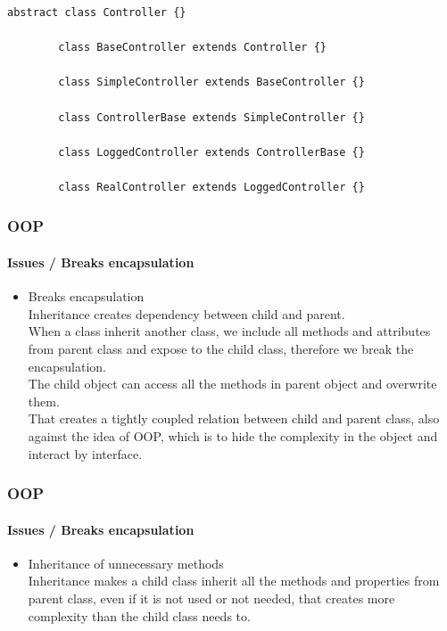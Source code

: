 \begin{frame}[fragile,c]
\begin{minipage}{.80\textwidth}
\begin{lstlisting}[numbers=none]
        abstract class Controller {}

        class BaseController extends Controller {}

        class SimpleController extends BaseController {}

        class ControllerBase extends SimpleController {}

        class LoggedController extends ControllerBase {}

        class RealController extends LoggedController {}
        \end{lstlisting}
    \end{minipage}
\end{frame}

\begin{frame}
    \frametitle{OOP}
    \framesubtitle{Issues / Breaks encapsulation}

    \begin{itemize}
        \item Breaks encapsulation\pause
              \textcolor{ecgrey!50}{
              \\Inheritance creates dependency between child and parent.\pause
              \\When a class inherit another class, we include all methods and attributes from parent
              class and expose to the child class, therefore we break the encapsulation.\pause
              \\The child object can access all the methods in parent object and overwrite them.\pause
              \\That creates a tightly coupled relation between child and parent class,
              also against the idea of OOP, which is to hide the complexity in the
              object and interact by interface.}
    \end{itemize}
\end{frame}

\begin{frame}
    \frametitle{OOP}
    \framesubtitle{Issues / Breaks encapsulation}

    \begin{itemize}
        \item Inheritance of unnecessary methods\pause
              \textcolor{ecgrey!50}{
              \\Inheritance makes a child class inherit all the methods
              and properties from parent class, even if it is not used or not needed,
              that creates more complexity than the child class needs to.}
    \end{itemize}
\end{frame}


